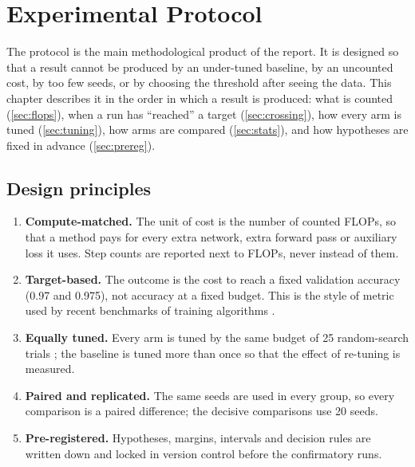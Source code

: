 \chapter{Experimental Protocol}\label{ch:protocol}

The protocol is the main methodological product of the report. It is designed so that a result cannot be produced by an under-tuned baseline, by an uncounted cost, by too few seeds, or by choosing the threshold after seeing the data. This chapter describes it in the order in which a result is produced: what is counted (\cref{sec:flops}), when a run has ``reached'' a target (\cref{sec:crossing}), how every arm is tuned (\cref{sec:tuning}), how arms are compared (\cref{sec:stats}), and how hypotheses are fixed in advance (\cref{sec:prereg}).

\section{Design principles}
\begin{enumerate}
\item \textbf{Compute-matched.} The unit of cost is the number of counted FLOPs, so that a method pays for every extra network, extra forward pass or auxiliary loss it uses. Step counts are reported next to FLOPs, never instead of them.
\item \textbf{Target-based.} The outcome is the cost to reach a fixed validation accuracy (0.97 and 0.975), not accuracy at a fixed budget. This is the style of metric used by recent benchmarks of training algorithms \citep{dahl2023benchmarking}.
\item \textbf{Equally tuned.} Every arm is tuned by the same budget of 25 random-search trials \citep{bergstra2012random}; the baseline is tuned more than once so that the effect of re-tuning is measured.
\item \textbf{Paired and replicated.} The same seeds are used in every group, so every comparison is a paired difference; the decisive comparisons use 20 seeds.
\item \textbf{Pre-registered.} Hypotheses, margins, intervals and decision rules are written down and locked in version control before the confirmatory runs.
\end{enumerate}

